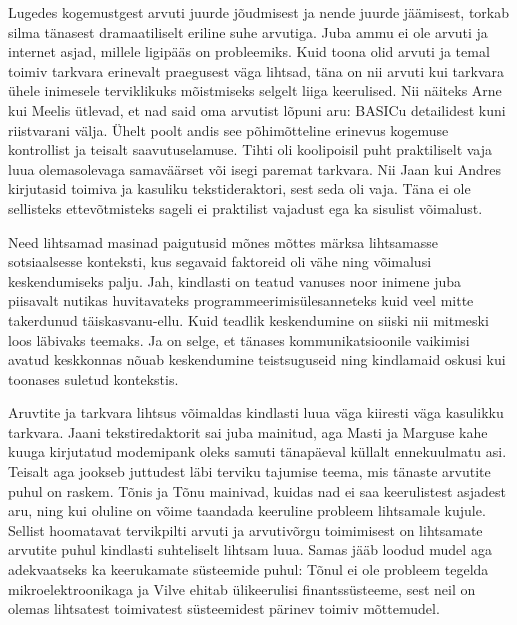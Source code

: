 Lugedes kogemustgest arvuti juurde jõudmisest ja nende juurde jäämisest, torkab silma tänasest dramaatiliselt eriline suhe arvutiga. Juba ammu ei ole arvuti ja internet asjad, millele ligipääs on probleemiks. Kuid toona olid arvuti ja temal toimiv tarkvara erinevalt praegusest väga lihtsad, täna on nii arvuti kui tarkvara ühele inimesele terviklikuks mõistmiseks selgelt liiga keerulised. Nii näiteks Arne kui Meelis ütlevad, et nad said oma arvutist lõpuni aru: BASICu detailidest kuni riistvarani välja. Ühelt poolt andis see põhimõtteline erinevus kogemuse kontrollist ja teisalt saavutuselamuse. Tihti oli koolipoisil puht praktiliselt vaja luua olemasolevaga samaväärset või isegi paremat tarkvara. Nii Jaan kui Andres kirjutasid  toimiva ja kasuliku tekstideraktori, sest seda oli vaja. Täna ei ole sellisteks ettevõtmisteks sageli ei praktilist vajadust ega ka sisulist võimalust.

Need lihtsamad masinad paigutusid mõnes mõttes märksa lihtsamasse sotsiaalsesse konteksti, kus segavaid faktoreid oli vähe ning võimalusi keskendumiseks palju. Jah, kindlasti on teatud vanuses noor inimene juba piisavalt nutikas huvitavateks programmeerimisülesanneteks kuid veel mitte takerdunud täiskasvanu-ellu. Kuid teadlik keskendumine on siiski nii mitmeski loos läbivaks teemaks. Ja on selge, et tänases kommunikatsioonile vaikimisi avatud keskkonnas nõuab keskendumine teistsuguseid ning kindlamaid oskusi kui toonases suletud kontekstis. 

Aruvtite ja tarkvara lihtsus võimaldas kindlasti luua väga kiiresti väga kasulikku tarkvara. Jaani tekstiredaktorit sai juba mainitud, aga Masti ja Marguse kahe kuuga kirjutatud modemipank oleks samuti tänapäeval küllalt ennekuulmatu asi. Teisalt aga jookseb juttudest läbi terviku tajumise teema, mis tänaste arvutite puhul on raskem. Tõnis ja Tõnu mainivad, kuidas nad ei saa keerulistest asjadest aru, ning kui oluline on võime taandada keeruline probleem lihtsamale kujule. Sellist hoomatavat tervikpilti arvuti ja arvutivõrgu toimimisest on lihtsamate arvutite puhul kindlasti suhteliselt lihtsam luua. Samas jääb loodud mudel aga adekvaatseks ka keerukamate süsteemide puhul: Tõnul ei ole probleem tegelda mikroelektroonikaga ja Vilve ehitab ülikeerulisi finantssüsteeme, sest neil on olemas lihtsatest toimivatest süsteemidest pärinev toimiv mõttemudel.

